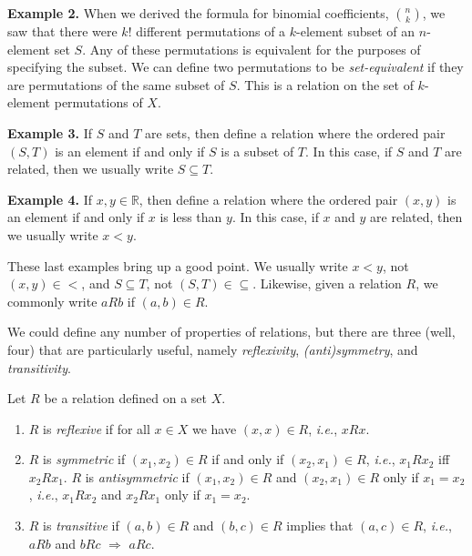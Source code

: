 \documentclass[12pt, letterpaper]{article}
\theoremstyle{definition}
\begin{document}
\vspace*{0.2in}\noindent
\textbf{Example 2.}
When we derived the formula for binomial coefficients, $\binom{n}{k}$, we saw
that there were $k!$ different permutations of a $k$-element subset of an
$n$-element set $S$. Any of these permutations is equivalent for the purposes
of specifying the subset. We can define two permutations to be
\emph{set-equivalent} if they are permutations of the same subset of $S$.
This is a relation on the set of $k$-element permutations of $X$.

\vspace*{0.2in}\noindent
\textbf{Example 3.}
If $S$ and $T$ are sets, then define a relation where the ordered pair $(S, T)$
is an element if and only if $S$ is a subset of $T$. In this case, if $S$ and
$T$ are related, then we usually write $S \subseteq T$.

\vspace*{0.2in}\noindent
\textbf{Example 4.}
If $x, y \in \mathbb{R}$, then define a relation where the ordered pair $(x, y)$
is an element if and only if $x$ is less than $y$. In this case, if $x$ and
$y$ are related, then we usually write $x < y$.

\vspace*{0.2in}
These last examples bring up a good point. We usually write $x<y$, not
$(x,y) \in <$, and $S \subseteq T$, not $(S,T) \in \subseteq$. Likewise, given
a relation $R$, we commonly write $aRb$ if $(a,b) \in R$.

We could define any number of properties of relations, but there are three
(well, four) that are particularly useful, namely \emph{reflexivity},
\emph{(anti)symmetry}, and \emph{transitivity}.

\clearpage\pagebreak\noindent
Let $R$ be a relation defined on a set $X$.
\begin{enumerate}[label=\textbf{\alph*.}]
    \item $R$ is \emph{reflexive} if for all $x \in X$ we have $(x,x) \in R$,
          \emph{i.e.}, $xRx$.
    \item $R$ is \emph{symmetric} if $(x_{1}, x_{2}) \in R$ if and only if
          $(x_{2}, x_{1}) \in R$, \emph{i.e.}, $x_{1}Rx_{2}$ iff $x_{2}Rx_{1}$.
          $R$ is \emph{antisymmetric} if $(x_{1}, x_{2}) \in R$ and
          $(x_{2}, x_{1}) \in R$ only if $x_{1} = x_{2}$, \emph{i.e.},
          $x_{1}Rx_{2}$ and $x_{2}Rx_{1}$ only if $x_{1} = x_{2}$.
    \item $R$ is \emph{transitive} if $(a,b) \in R$ and $(b,c) \in R$ implies
          that $(a,c) \in R$, \emph{i.e.}, $aRb$ and $bRc$ $\Rightarrow$ $aRc$.
\end{enumerate}
\end{document}
